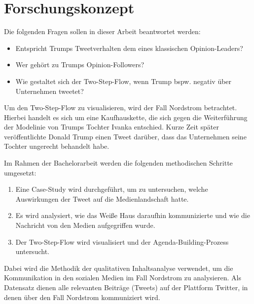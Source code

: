 \section{Forschungskonzept}
\label{sec:forschungskonzept}

Die folgenden Fragen sollen in dieser Arbeit beantwortet werden:

\begin{itemize}
    \item Entspricht Trumps Tweetverhalten dem eines klassischen Opinion-Leaders?
    \item Wer gehört zu Trumps Opinion-Followers?
    \item Wie gestaltet sich der Two-Step-Flow, wenn Trump bspw. negativ über Unternehmen tweetet?
\end{itemize}

Um den Two-Step-Flow zu visualisieren, wird der Fall Nordstrom betrachtet. Hierbei handelt es sich um eine Kaufhauskette, die sich gegen die Weiterführung der Modelinie von Trumps Tochter Ivanka entschied. Kurze Zeit später veröffentlichte Donald Trump einen Tweet darüber, dass das Unternehmen seine Tochter ungerecht behandelt habe.

Im Rahmen der Bachelorarbeit werden die folgenden methodischen Schritte umgesetzt:
\begin{enumerate}
    \item Eine Case-Study wird durchgeführt, um zu untersuchen, welche Auswirkungen der Tweet auf die Medienlandschaft hatte.
    \item Es wird analysiert, wie das Weiße Haus daraufhin kommunizierte und wie die Nachricht von den Medien aufgegriffen wurde.
    \item Der Two-Step-Flow wird visualisiert und der Agenda-Building-Prozess untersucht.
\end{enumerate}

Dabei wird die Methodik der qualitativen Inhaltsanalyse verwendet, um die Kommunikation in den sozialen Medien im Fall Nordstrom zu analysieren. Als Datensatz dienen alle relevanten Beiträge (Tweets) auf der Plattform Twitter, in denen über den Fall Nordstrom kommuniziert wird.